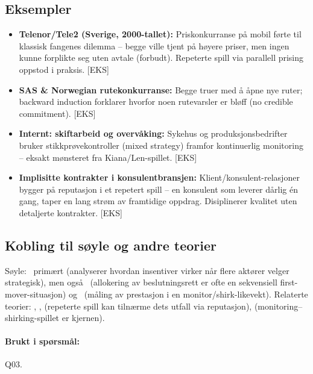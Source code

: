 \subsection*{Eksempler}
\begin{itemize}
\item \textbf{Telenor/Tele2 (Sverige, 2000-tallet):} Pris\-konkurranse på mobil førte til klassisk fangenes dilemma -- begge ville tjent på høyere priser, men ingen kunne forplikte seg uten avtale (forbudt). Repeterte spill via parallell prising oppstod i praksis. [EKS]
\item \textbf{SAS \& Norwegian rute\-konkurranse:} Begge truer med å åpne nye ruter; backward induction forklarer hvorfor noen rutevarsler er bløff (no credible commitment). [EKS]
\item \textbf{Internt: skiftarbeid og overvåking:} Sykehus og produksjons\-bedrifter bruker stikkprøvekontroller (mixed strategy) framfor kontinuerlig monitoring -- eksakt mønsteret fra Kiana/Len-spillet. [EKS]
\item \textbf{Implisitte kontrakter i konsulentbransjen:} Klient/konsulent-relasjoner bygger på reputasjon i et repetert spill -- en konsulent som leverer dårlig én gang, taper en lang strøm av framtidige oppdrag. Disiplinerer kvalitet uten detaljerte kontrakter. [EKS]
\end{itemize}

\subsection*{Kobling til søyle og andre teorier}
Søyle: \SThree\ primært (analyserer hvordan insentiver virker når flere aktører velger strategisk), men også \SOne\ (allokering av beslutningsrett er ofte en sekvensiell first-mover-situasjon) og \STwo\ (måling av prestasjon i en monitor/shirk-likevekt). Relaterte teorier: , ,  (repeterte spill kan tilnærme dets utfall via reputasjon),  (monitoring--shirking-spillet er kjernen).

\paragraph{Brukt i spørsmål:} Q03.
